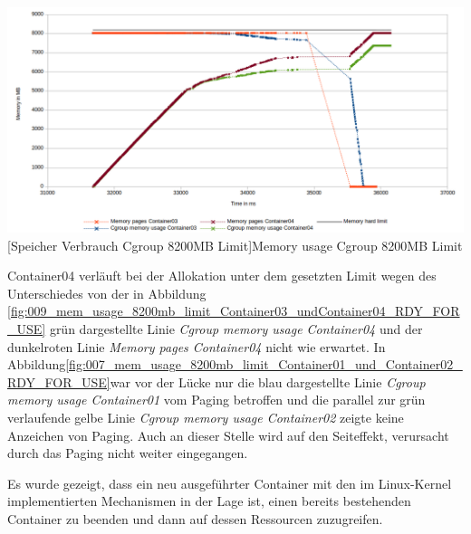 \vspace{1em}
\begin{minipage}{\linewidth}
	\centering
	\includegraphics[width=1\linewidth]{pics/010_mem_usage_8200mb_limit_Container03_undContainer04_RDY_FOR_USE_Focus.png}
	[Speicher Verbrauch Cgroup 8200MB Limit]{Memory usage Cgroup 8200MB Limit}
	\label{fig:010_mem_usage_8200mb_limit_Container03_undContainer04_RDY_FOR_USE_Focu}
\end{minipage}

Container04 verläuft bei der Allokation unter dem gesetzten Limit wegen des Unterschiedes von der in Abbildung \ref{fig:009_mem_usage_8200mb_limit_Container03_undContainer04_RDY_FOR_USE} grün dargestellte Linie \emph{Cgroup memory usage Container04} und der dunkelroten Linie \emph{Memory pages Container04} nicht wie erwartet. In Abbildung\ref{fig:007_mem_usage_8200mb_limit_Container01_und_Container02_RDY_FOR_USE}war vor der Lücke nur die blau dargestellte Linie \emph{Cgroup memory usage Container01} vom Paging betroffen und die parallel zur grün verlaufende gelbe Linie \emph{Cgroup memory usage Container02} zeigte keine Anzeichen von Paging. Auch an dieser Stelle wird auf den Seiteffekt, verursacht durch das Paging nicht weiter eingegangen.

Es wurde gezeigt, dass ein neu ausgeführter Container mit den im Linux-Kernel implementierten Mechanismen in der Lage ist, einen bereits bestehenden Container zu beenden und dann auf dessen Ressourcen zuzugreifen.



\pagebreak
